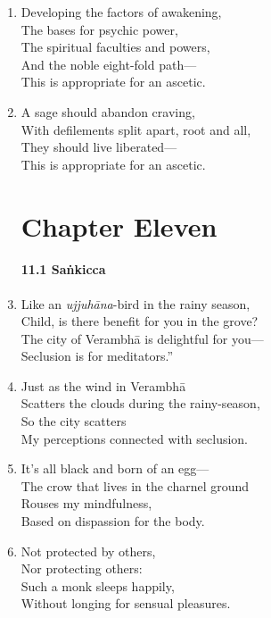 \documentclass[10pt, openany]{book}
\newcommand*{\vleftofline}[1]{\leavevmode\llap{#1}}
\begin{document}
\begin{enumerate}
\item Developing the factors of awakening,\\
The bases for psychic power, \\
The spiritual faculties and powers,\\
And the noble eight-fold path—\\
This is appropriate for an ascetic.

\item A sage should abandon craving,\\
With defilements split apart, root and all,\\
They should live liberated—\\
This is appropriate for an ascetic.

\chapter*{Chapter Eleven}

\subsubsection*{11.1 Saṅkicca}

\item \vleftofline{“}Like an \emph{ujjuhāna}-bird in the rainy season,\\
Child, is there benefit for you in the grove?\\
The city of Verambhā is delightful for you—\\
Seclusion is for meditators.”

\item \vleftofline{“}Just as the wind in Verambhā\\
Scatters the clouds during the rainy-season,\\
So the city scatters\\
My perceptions connected with seclusion.

\item It’s all black and born of an egg—\\
The crow that lives in the charnel ground\\
Rouses my mindfulness,\\
Based on dispassion for the body.

\item Not protected by others,\\
Nor protecting others:\\
Such a monk sleeps happily,\\
Without longing for sensual pleasures.


\end{enumerate}
\end{document}
